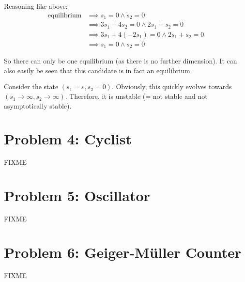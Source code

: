 \documentclass[a4paper,parskip,headheight=38pt]{scrartcl} %
\begin{document}
Reasoning like above:
\begin{align*}
    \text{equilibrium}
    &\implies \dot{s}_1 = 0 \land \dot{s}_2 = 0 \\
    &\implies 3s_1 + 4s_2 = 0 \land 2s_1 + s_2 = 0 \\
    &\implies 3s_1 + 4(-2s_1) = 0 \land 2s_1 + s_2 = 0 \\
    &\implies s_1 = 0 \land s_2 = 0
\end{align*}

So there can only be one equilibrium (as there is no further
dimension).  It can also easily be seen that this candidate is in fact
an equilibrium.

Consider the state $(s_1=\varepsilon, s_2 = 0)$.  Obviously, this
quickly evolves towards $(s_1 \to \infty, s_2 \to \infty)$.  Therefore,
it is unstable (= not stable and not asymptotically stable).


\section*{Problem 4: Cyclist}

FIXME


\section*{Problem 5: Oscillator}

FIXME


\section*{Problem 6: Geiger-Müller Counter}

FIXME
\end{document}
